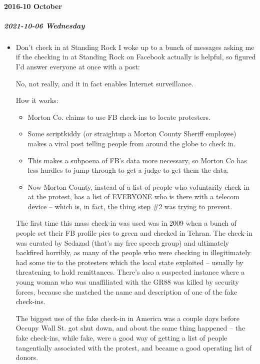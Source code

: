 \documentclass[11pt]{article}
\begin{document}
\paragraph*{2016-10 October}
\label{sec:orgfdbe082}
\startcontents[level-4]
\subparagraph*{2021-10-06 Wednesday}
\label{sec:org78a6855}
\begin{itemize}
\item Don't check in at Standing Rock
\label{sec:org288f0be}
I woke up to a bunch of messages asking me if the checking in at Standing Rock on Facebook actually is helpful, so figured I’d answer everyone at once with a post:

No, not really, and it in fact enables Internet surveillance.

How it works:

\begin{itemize}
\item Morton Co. claims to use FB check-ins to locate protesters.
\item Some scriptkiddy (or straightup a Morton County Sheriff employee) makes a viral post telling people from around the globe to check in.
\item This makes a subpoena of FB’s data more necessary, so Morton Co has less hurdles to jump through to get a judge to get them the data.
\item Now Morton County, instead of a list of people who voluntarily check in at the protest, has a list of EVERYONE who is there with a telecom device – which is, in fact, the thing step \#2 was trying to prevent.
\end{itemize}

The first time this mass check-in was used was in 2009 when a bunch of people set their FB profile pics to green and checked in Tehran. The check-in was curated by Sedazad (that’s my free speech group) and ultimately backfired horribly, as many of the people who were checking in illegitimately had some tie to the protesters which the local state exploited – usually by threatening to hold remittances. There’s also a suspected instance where a young woman who was unaffiliated with the GR88 was killed by security forces, because she matched the name and description of one of the fake check-ins.

The biggest use of the fake check-in in America was a couple days before Occupy Wall St. got shut down, and about the same thing happened – the fake check-ins, while fake, were a good way of getting a list of people tangentially associated with the protest, and became a good operating list of donors.


\end{itemize}
\end{document}
